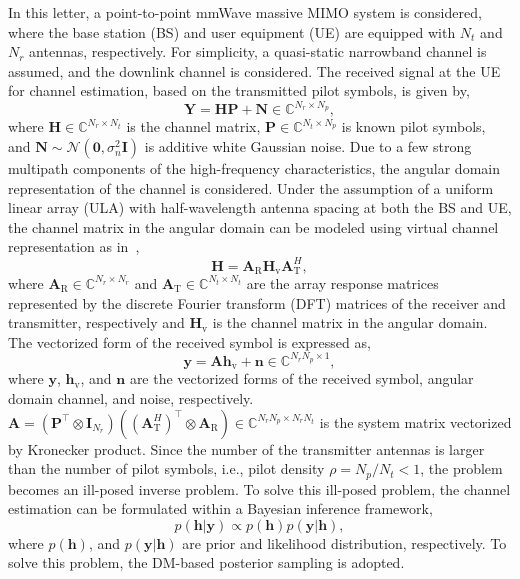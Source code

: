 \documentclass[lettersize,journal]{IEEEtran}
\begin{document}
In this letter, a point-to-point mmWave massive MIMO system is considered, where the base station (BS) and user equipment (UE) are equipped with $N_{t}$ and $N_{r}$ antennas, respectively. For simplicity, a quasi-static narrowband channel is assumed, and the downlink channel is considered. The received signal at the UE for channel estimation, based on the transmitted pilot symbols, is given by,
\begin{equation}
\mathbf{Y}=\mathbf{H}\mathbf{P}+\mathbf{N}\in \mathbb{C}^{N_{r}\times N_{p}},
\end{equation}
where $\mathbf{H}\in \mathbb{C}^{N_{r}\times N_{t}}$ is the channel matrix, $\mathbf{P}\in \mathbb{C}^{N_{t}\times N_{p}}$ is known pilot symbols, and $\mathbf{N}\sim\mathcal{N}(\mathbf{0},\sigma^{2}_{n}\mathbf{I})$ is additive white Gaussian noise. Due to a few strong multipath components of the high-frequency characteristics, the angular domain representation of the channel is considered. Under the assumption of a uniform linear array (ULA) with half-wavelength antenna spacing at both the BS and UE, the channel matrix in the angular domain can be modeled using virtual channel representation as in~\cite{sayeedDeconstructingMultiantennaFading2002},
\begin{equation}
\mathbf{H} = \mathbf{A}_{\text{R}}\mathbf{H}_{\text{v}}\mathbf{A}_{\text{T}}^{H},
\end{equation}
where $\mathbf{A}_{\text{R}}\in \mathbb{C}^{N_{r}\times N_{r}}$ and $\mathbf{A}_{\text{T}}\in \mathbb{C}^{N_{t}\times N_{t}}$ are the array response matrices represented by the discrete Fourier transform (DFT) matrices of the receiver and transmitter, respectively and $\mathbf{H}_{\text{v}}$ is the channel matrix in the angular domain.
The vectorized form of the received symbol is expressed as,
\begin{equation}
\mathbf{y} = \mathbf{A}\mathbf{h}_{\text{v}}+\mathbf{n}\in \mathbb{C}^{N_{r}N_{p}\times 1},
\end{equation}
where $\mathbf{y}$, $\mathbf{h}_{\text{v}}$, and $\mathbf{n}$ are the vectorized forms of the received symbol, angular domain channel, and noise, respectively. $\mathbf{A}=(\mathbf{P}^{\top}\otimes\mathbf{I}_{N_{r}})((\mathbf{A}_{\text{T}}^{H})^{\top}\otimes \mathbf{A}_{\text{R}})\in \mathbb{C}^{N_{r}N_{p}\times N_{r}N_{t}}$ is the system matrix vectorized by Kronecker product.
Since the number of the transmitter antennas is larger than the number of pilot symbols, i.e., pilot density $\rho=N_{p}/N_{t}<1$, the problem becomes an ill-posed inverse problem.
To solve this ill-posed problem, the channel estimation can be formulated within a Bayesian inference framework,
\begin{equation}
  p(\mathbf{h}|\mathbf{y})\propto p(\mathbf{h})p(\mathbf{y}|\mathbf{h}),
\end{equation}
where $p(\mathbf{h})$, and $p(\mathbf{y}|\mathbf{h})$ are prior and likelihood distribution, respectively. To solve this problem, the DM-based posterior sampling is adopted.
\end{document}
